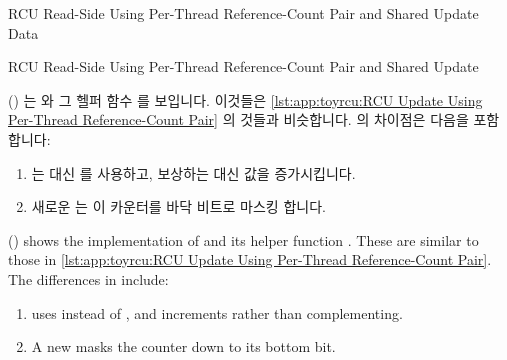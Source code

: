 \fi

\begin{listing}[tbp]

\caption{RCU Read-Side Using Per-Thread Reference-Count Pair and Shared Update Data}
\label{lst:app:toyrcu:RCU Read-Side Using Per-Thread Reference-Count Pair and Shared Update Data}
\end{listing}

\begin{listing}[tbp]

\caption{RCU Read-Side Using Per-Thread Reference-Count Pair and Shared Update}
\label{lst:app:toyrcu:RCU Read-Side Using Per-Thread Reference-Count Pair and Shared Update}
\end{listing}

()
는  와 그 헬퍼 함수  를
보입니다.
이것들은
\cref{lst:app:toyrcu:RCU Update Using Per-Thread Reference-Count Pair}
의 것들과 비슷합니다.
 의 차이점은 다음을 포함합니다:
\begin{fcvref}
\begin{enumerate}
\item	{} 는  대신  를 사용하고,
	보상하는 대신 값을 증가시킵니다.
\item	새로운  는 이 카운터를 바닥 비트로 마스킹 합니다.
\end{enumerate}
\end{fcvref}

\iffalse

()
shows the implementation of  and its helper
function .
These are similar to those in
\cref{lst:app:toyrcu:RCU Update Using Per-Thread Reference-Count Pair}.
The differences in  include:
\begin{fcvref}
\begin{enumerate}
\item	{} uses  instead of ,
	and increments rather than complementing.
\item	A new  masks the counter down to its bottom bit.
\end{enumerate}
\end{fcvref}

